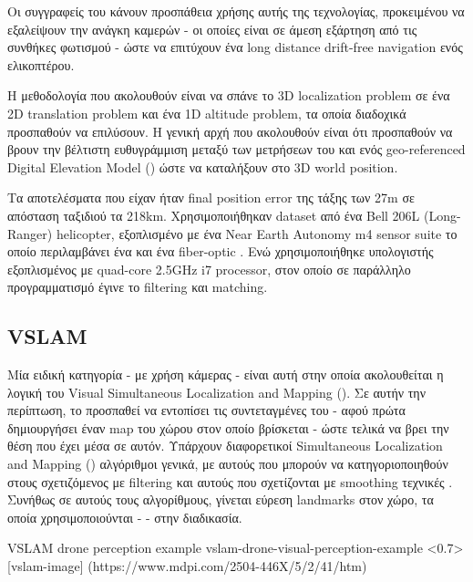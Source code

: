 Οι συγγραφείς του \cite{lidar-usage-example} κάνουν προσπάθεια χρήσης αυτής της τεχνολογίας, προκειμένου να εξαλείψουν την ανάγκη καμερών - οι οποίες είναι σε άμεση εξάρτηση από τις συνθήκες φωτισμού - ώστε να επιτύχουν ένα long distance drift-free navigation ενός ελικοπτέρου.

Η μεθοδολογία που ακολουθούν είναι να σπάνε το 3D localization problem σε ένα 2D translation problem και ένα 1D altitude problem, τα οποία διαδοχικά προσπαθούν να επιλύσουν. Η γενική αρχή που ακολουθούν είναι ότι προσπαθούν να βρουν την βέλτιστη ευθυγράμμιση μεταξύ των μετρήσεων του  και ενός geo-referenced Digital Elevation Model () ώστε να καταλήξουν στο 3D world position.

Τα αποτελέσματα που είχαν ήταν final position error της τάξης των 27m σε απόσταση ταξιδιού τα 218km. Χρησιμοποιήθηκαν dataset από ένα Bell 206L (Long-Ranger) helicopter, εξοπλισμένο με ένα Near Earth Autonomy m4 sensor suite το οποίο περιλαμβάνει ένα   και ένα fiber-optic . Ενώ χρησιμοποιήθηκε υπο\-λο\-γι\-στής εξοπλισμένος με quad-core 2.5GHz i7 processor, στον οποίο σε παράλληλο προγραμματισμό έγινε το filtering και matching.

\subsection{VSLAM}	\label{sec:related-vslam}
Μία ειδική κατηγορία - με χρήση κάμερας - είναι αυτή στην οποία ακολουθείται η λογική του Visual Simultaneous Localization and Mapping (). Σε αυτήν την περίπτωση, το  προσπαθεί να εντοπίσει τις συντεταγμένες του - αφού πρώτα δημιουργήσει έναν map του χώρου στον οποίο βρίσκεται - ώστε τελικά να βρει την θέση που έχει μέσα σε αυτόν. 
Υπάρχουν διαφορετικοί Simultaneous Lo\-ca\-li\-za\-tion and Mapping () αλγόριθμοι γενικά, με αυτούς που μπορούν να κατηγοριοποιηθούν στους σχετιζόμενος με filtering και αυτούς που σχετίζονται με smoothing τεχνικές \cite{related-slam-difs}. Συνήθως σε αυτούς τους αλγορίθμους, γίνεται εύρεση landmarks στον χώρο, τα οποία χρησιμοποιούνται -  - στην διαδικασία.

{VSLAM drone perception example}%
{vslam-drone-visual-perception-example}%
<0.7>%
[vslam-image]%
(https://www.mdpi.com/2504-446X/5/2/41/htm)


